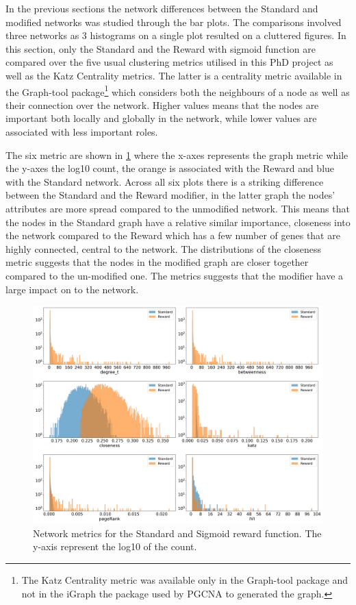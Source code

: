 In the previous sections the network differences between the Standard and modified networks was studied through the bar plots. The comparisons involved three networks as 3 histograms on a single plot resulted on a cluttered figures. In this section, only the Standard and the Reward with sigmoid function are compared over the five usual clustering metrics utilised in this PhD project as well as the Katz Centrality metrics. The latter is a centrality metric available in the Graph-tool package\footnote{The Katz Centrality metric was available only in the Graph-tool package and not in the iGraph the package used by PGCNA to generated the graph.} which considers both the neighbours of a node as well as their connection over the network. Higher values means that the nodes are important both locally and globally in the network, while lower values are associated with less important roles. 

The six metric are shown in \cref{fig:N_II:net_metric_sig_std} where the x-axes represents the graph metric while the y-axes the log10 count, the orange is associated with the Reward and blue with the Standard network. Across all six plots there is a striking difference between the Standard and the Reward modifier,  in the latter graph the nodes' attributes are more spread compared to the unmodified network. This means that the nodes in the Standard graph have a relative similar importance, closeness into the network compared to the Reward which has a few number of genes that are highly connected, central to the network.
The distributions of the closeness metric suggests that the nodes in the modified graph are closer together compared to the un-modified one. The metrics suggests that the modifier have a large impact on to the network.


\begin{figure}[H]    
    \centering
    \includegraphics[width=1.0\textwidth,height=1.0\textheight,keepaspectratio]{Sections/Network_II/validation/net_metrics_Standard_Reward.png}
    \caption{Network metrics for the Standard and Sigmoid reward function. The y-axis represent the log10 of the count. }
    \label{fig:N_II:net_metric_sig_std}
\end{figure}



